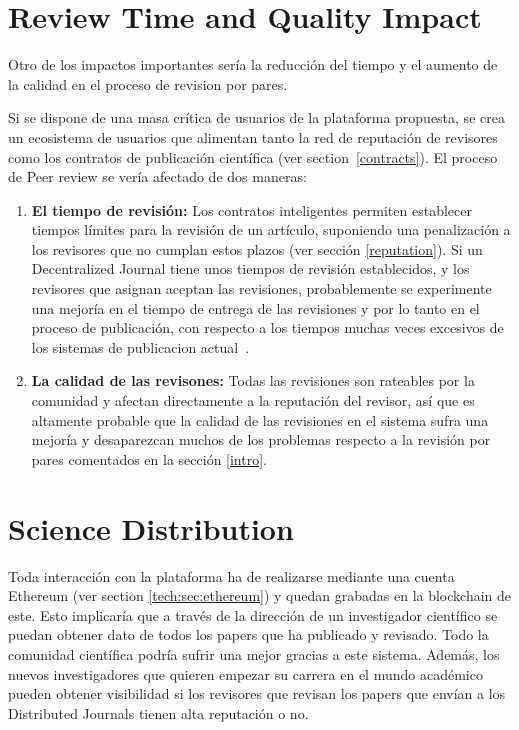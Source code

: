 \section{Review Time and Quality Impact}

Otro de los impactos importantes sería la reducción del tiempo y el aumento de
la calidad en el proceso de revision por pares.

Si se dispone de una masa crítica de usuarios de la plataforma propuesta, se
crea un ecosistema de usuarios que alimentan tanto la red de reputación de
revisores como los contratos de publicación científica (ver
section~\ref{contracts}). El proceso de Peer review se vería afectado de dos
maneras:

\begin{enumerate}
\item \textbf{El tiempo de revisión:} Los contratos inteligentes permiten
  establecer tiempos límites para la revisión de un artículo, suponiendo una
  penalización a los revisores que no cumplan estos plazos (ver sección
  \ref{reputation}). Si un Decentralized Journal tiene unos tiempos de revisión
  establecidos, y los revisores que asignan aceptan las revisiones,
  probablemente se experimente una mejoría en el tiempo de entrega de las
  revisiones y por lo tanto en el proceso de publicación, con respecto a los
  tiempos muchas veces excesivos de los sistemas de publicacion
  actual~\cite{huisman2017duration}.
\item \textbf{La calidad de las revisones:} Todas las revisiones son rateables
  por la comunidad y afectan directamente a la reputación del revisor, así que
  es altamente probable que la calidad de las revisiones en el sistema sufra una
  mejoría y desaparezcan muchos de los problemas respecto a la revisión por
  pares comentados en la sección \ref{intro}.
\end{enumerate}

\section{Science Distribution}

Toda interacción con la plataforma ha de realizarse mediante una cuenta Ethereum
(ver section \ref{tech:sec:ethereum}) y quedan grabadas en la blockchain de
este. Esto implicaría que a través de la dirección de un investigador científico
se puedan obtener dato de todos los papers que ha publicado y revisado. Todo la
comunidad científica podría sufrir una mejor gracias a este sistema. Además, los
nuevos investigadores que quieren empezar su carrera en el mundo académico
pueden obtener visibilidad si los revisores que revisan los papers que envían a
los Distributed Journals tienen alta reputación o no.

